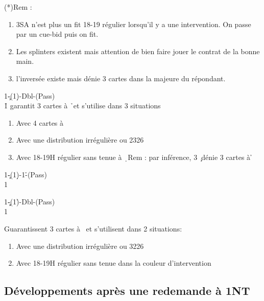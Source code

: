 \documentclass[a4paper]{article}
\begin{document}
(*)Rem :

\begin{enumerate}
\item 3SA n’est plus un fit 18-19 régulier lorsqu’il y a une intervention. On passe
par un cue-bid puis on fit.

\item Les splinters existent mais attention de bien faire jouer le contrat de la 
bonne main.

\item l’inversée existe mais dénie 3 cartes dans la majeure du répondant.

\end{enumerate}

\begin{bidtable}
1\c-(1\d)-Dbl-(Pass)\\
1\h \> garantit 3 cartes à \h\ et s’utilise dans 3 situations
\end{bidtable}

\begin{enumerate}
\item Avec 4 cartes à \s\ 

\item Avec une distribution irrégulière ou 2326

\item Avec 18-19H régulier sans tenue à \d\ 
Rem : par inférence, 3 \c\ dénie 3 cartes à \h 

\end{enumerate}

\begin{bidtable}
1\c-(1\d)-1\h-(Pass)\\
1\s
\end{bidtable}

\begin{bidtable}
1\c\d-(1\h)-Dbl-(Pass)\\
1\s
\end{bidtable}

Guarantissent 3 cartes à \s\ et s’utilisent dans 2 situations:

\begin{enumerate}
\item Avec une distribution irrégulière ou 3226

\item Avec 18-19H régulier sans tenue dans la couleur d’intervention

\end{enumerate}

\subsection{Développements après une redemande à 1NT}
\end{document}

